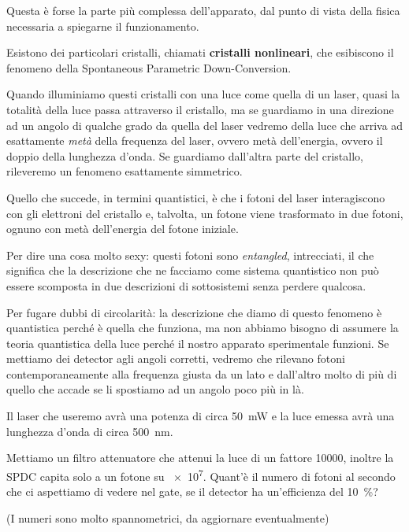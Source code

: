 \documentclass[a4paper,12pt]{article}
\begin{document}
Questa è forse la parte più complessa dell'apparato, dal punto di vista della fisica necessaria a spiegarne il funzionamento.

Esistono dei particolari cristalli, chiamati \textbf{cristalli nonlineari}, che esibiscono il fenomeno della Spontaneous Parametric Down-Conversion.

Quando illuminiamo questi cristalli con una luce come quella di un laser, quasi la totalità della luce passa attraverso il cristallo, ma se guardiamo in una direzione ad un angolo di qualche grado da quella del laser vedremo della luce che arriva ad esattamente \emph{metà} della frequenza del laser, ovvero metà dell'energia, ovvero il doppio della lunghezza d'onda. 
Se guardiamo dall'altra parte del cristallo, rileveremo un fenomeno esattamente simmetrico.

Quello che succede, in termini quantistici, è che i fotoni del laser interagiscono con gli elettroni del cristallo e, talvolta, un fotone viene trasformato in due fotoni, ognuno con metà dell'energia del fotone iniziale.

Per dire una cosa molto sexy: questi fotoni sono \emph{entangled}, intrecciati, il che significa che la descrizione che ne facciamo come sistema quantistico non può essere scomposta in due descrizioni di sottosistemi senza perdere qualcosa. 

Per fugare dubbi di circolarità: la descrizione che diamo di questo fenomeno è quantistica perché è quella che funziona, ma non abbiamo bisogno di assumere la teoria quantistica della luce perché il nostro apparato sperimentale funzioni.
Se mettiamo dei detector agli angoli corretti, vedremo che rilevano fotoni contemporaneamente alla frequenza giusta da un lato e dall'altro molto di più di quello che accade se li spostiamo ad un angolo poco più in là. 

\begin{exo}
Il laser che useremo avrà una potenza di circa \SI{50}{mW} e la luce emessa avrà una lunghezza d'onda di circa \SI{500}{nm}. 

Mettiamo un filtro attenuatore che attenui la luce di un fattore 10000, inoltre la SPDC capita solo a un fotone su \num{e7}. Quant'è il numero di fotoni al secondo che ci aspettiamo di vedere nel gate, se il detector ha un'efficienza del \SI{10}{\percent}?

(I numeri sono molto spannometrici, da aggiornare eventualmente)
\end{exo}
\end{document}
